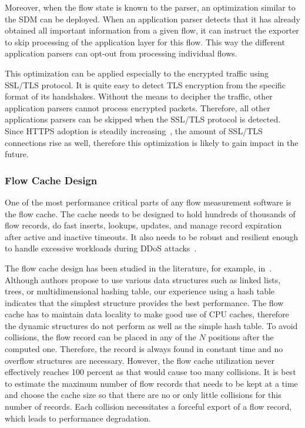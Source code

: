 Moreover, when the flow state is known to the parser, an optimization similar to the SDM can be deployed. When an application parser detects that it has already obtained all important information from a given flow, it can instruct the exporter to skip processing of the application layer for this flow. This way the different application parsers can opt-out from processing individual flows.

This optimization can be applied especially to the encrypted traffic using SSL/TLS protocol. It is quite easy to detect TLS encryption from the specific format of its handshakes. Without the means to decipher the traffic, other application parsers cannot process encrypted packets. Therefore, all other applications parsers can be skipped when the SSL/TLS protocol is detected. Since HTTPS adoption is steadily increasing~\cite{Felt-2017-Measuring}, the amount of SSL/TLS connections rise as well, therefore this optimization is likely to gain impact in the future.

\subsubsection{Flow Cache Design}

One of the most performance critical parts of any flow measurement software is the flow cache. The cache needs to be designed to hold hundreds of thousands of flow records, do fast inserts, lookups, updates, and manage record expiration after active and inactive timeouts. It also needs to be robust and resilient enough to handle excessive workloads during DDoS attacks~\cite{Sadre-2012-Effects}. 

The flow cache design has been studied in the literature, for example, in~\cite{Wang-2011-Memory, Nassopulos-2014-Flow}. Although authors propose to use various data structures such as linked lists, trees, or multidimensional hashing table, our experience using a hash table indicates that the simplest structure provides the best performance. The flow cache has to maintain data locality to make good use of CPU caches, therefore the dynamic structures do not perform as well as the simple hash table. To avoid collisions, the flow record can be placed in any of the $N$ positions after the computed one. Therefore, the record is always found in constant time and no overflow structures are necessary. However, the flow cache utilization never effectively reaches 100 percent as that would cause too many collisions. It is best to estimate the maximum number of flow records that needs to be kept at a time and choose the cache size so that there are no or only little collisions for this number of records. Each collision necessitates a forceful export of a flow record, which leads to performance degradation.

